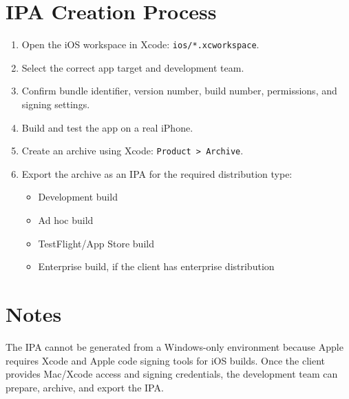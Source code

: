 \documentclass[11pt]{article}
\begin{document}
\section*{IPA Creation Process}

\begin{enumerate}[leftmargin=*]
  \item Open the iOS workspace in Xcode: \texttt{ios/*.xcworkspace}.
  \item Select the correct app target and development team.
  \item Confirm bundle identifier, version number, build number, permissions, and signing settings.
  \item Build and test the app on a real iPhone.
  \item Create an archive using Xcode: \texttt{Product > Archive}.
  \item Export the archive as an IPA for the required distribution type:
  \begin{itemize}
    \item Development build
    \item Ad hoc build
    \item TestFlight/App Store build
    \item Enterprise build, if the client has enterprise distribution
  \end{itemize}
\end{enumerate}

\section*{Notes}

The IPA cannot be generated from a Windows-only environment because Apple requires Xcode and Apple code signing tools for iOS builds. Once the client provides Mac/Xcode access and signing credentials, the development team can prepare, archive, and export the IPA.
\end{document}

